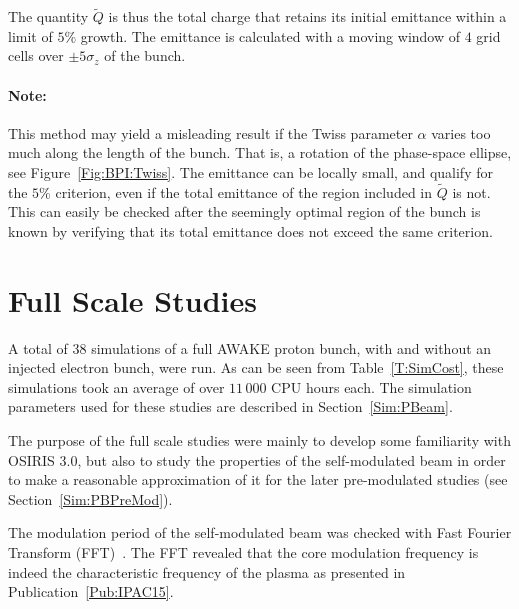 The quantity $\tilde{Q}$ is thus the total charge that retains its initial emittance within a limit of $5\%$ growth.
The emittance is calculated with a moving window of $4$ grid cells over $\pm 5\sigma_z$ of the bunch.

\paragraph{Note:} This method may yield a misleading result if the Twiss parameter $\alpha$ varies too much along the length of the bunch.
That is, a rotation of the phase-space ellipse, see Figure~\ref{Fig:BPI:Twiss}.
The emittance can be locally small, and qualify for the $5\%$ criterion, even if the total emittance of the region included in $\tilde{Q}$ is not.
This can easily be checked after the seemingly optimal region of the bunch is known by verifying that its total emittance does not exceed the same criterion.

\section{Full Scale Studies}
\label{SimA:FullScale}

A total of 38 simulations of a full AWAKE proton bunch, with and without an injected electron bunch, were run.
As can be seen from Table~\ref{T:SimCost}, these simulations took an average of over $11\,000$ CPU hours each.
The simulation parameters used for these studies are described in Section~\ref{Sim:PBeam}.

The purpose of the full scale studies were mainly to develop some familiarity with OSIRIS 3.0, but also to study the properties of the self-modulated beam in order to make a reasonable approximation of it for the later pre-modulated studies (see Section~\ref{Sim:PBPreMod}).

The modulation period of the self-modulated beam was checked with Fast Fourier Transform (FFT)~\cite{van_loan:1992}.
The FFT revealed that the core modulation frequency is indeed the characteristic frequency of the plasma as presented in Publication~\ref{Pub:IPAC15}.

